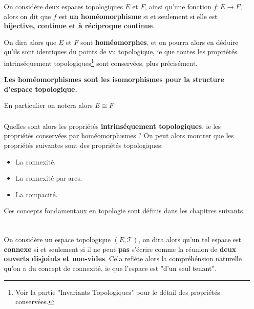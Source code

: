 \subsection*{}
On considère deux espaces topologiques \(E\) et \(F\), ainsi qu'une fonction \(f : E \longrightarrow F\), alors on dit que \(f\) est \textbf{un homéomorphisme} si et seulement si elle est \textbf{bijective, continue et à réciproque continue}.\<

On dira alors que \(E\) et \(F\) sont \textbf{homéomorphes}, et on pourra alors en déduire qu'ils sont identiques du points de vu topologique, ie que toutes les propriétés intrinséquement topologiques\footnote[1]{Voir la partie "Invariants Topologiques" pour le détail des propriétés conservées.} sont conservées, plus précisément.
\begin{center}
   \textbf{Les homéomorphismes sont les isomorphismes pour la structure d'espace topologique.}
\end{center}
En particulier on notera alors \(E \cong F\)
\subsection*{}
Quelles sont alors les propriétés \textbf{intrinséquement topologiques}, ie les propriétés conservées par homéomorphismes ? On peut alors montrer que les propriétés suivantes sont des propriétés topologiques:
\begin{itemize}
   \item La connexité.
   \item La connexité par arcs.
   \item La compacité.
\end{itemize}
Ces concepts fondamentaux en topologie sont définis dans les chapitres suivants.

\chapter*{}
On considère un espace topologique \((E, \mathcal{T})\), on dira alors qu'un tel espace est \textbf{connexe} si et seulement si il ne peut \textbf{pas} s'écrire comme la réunion de \textbf{deux ouverts disjoints et non-vides}. Cela reflète alors la compréhénsion naturelle qu'on a du concept de connexité, ie que l'espace est "d'un seul tenant".
